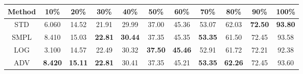 \documentclass{standalone}
\begin{document}
\begin{tabular}{c|cccccccccc}
      \toprule
      Method & 10\% & 20\% & 30\% & 40\% & 50\% & 60\% & 70\% & 80\% & 90\% & 100\% \\
      \midrule
STD & 6.060 & 14.52 & 21.91 & 29.99 & 37.00 & 45.36 & 53.07 & 62.03 & \textbf{72.50} & \textbf{93.80}\\
SMPL & 8.410 & 15.03 & \textbf{22.81} & \textbf{30.44} & 37.35 & 45.35 & \textbf{53.35} & 61.50 & 72.45 & 93.58\\
LOG & 3.100 & 14.57 & 22.49 & 30.32 & \textbf{37.50} & \textbf{45.46} & 52.91 & 61.72 & 72.21 & 92.38\\
ADV & \textbf{8.420} & \textbf{15.11} & \textbf{22.81} & 30.41 & 37.35 & 45.21 & \textbf{53.35} & \textbf{62.26} & 72.45 & 93.60\\
  \bottomrule
\end{tabular}
\end{document}
